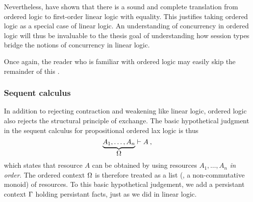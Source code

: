 Nevertheless, \textcite{Simmons+Pfenning:HOSC11} have shown that there is a sound and complete translation from ordered logic to first-order linear logic with equality.
This justifies taking ordered logic as a special case of linear logic.
An understanding of concurrency in ordered logic will thus be invaluable to the thesis goal of understanding how session types bridge the notions of concurrency in linear logic.

Once again, the reader who is familiar with ordered logic may easily skip the remainder of this .

\subsubsection{Sequent calculus}\label{sec:sequent-calculus}

In addition to rejecting contraction and weakening like linear logic, ordered logic also rejects the structural principle of exchange.
The basic hypothetical judgment in the sequent calculus for propositional ordered lax logic is thus
\begin{equation*}
  \underbrace{A_1, \dotsc, A_n}_{\displaystyle \Omega} \vdash A \:,
\end{equation*}
which states that resource $A$ can be obtained by using resources $A_1, \dotsc, A_n$ \emph{in order}.
The ordered context $\Omega$ is therefore treated as a list (\ie, a non-commutative monoid) of resources.
To this basic hypothetical judgement, we add a persistant context $\Gamma$ holding persistant facts, just as we did in linear logic.


